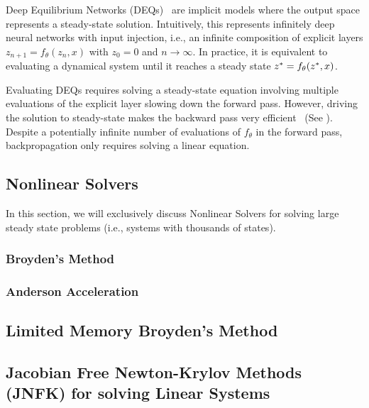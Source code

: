 Deep Equilibrium Networks (DEQs)~\citep{bai_deep_2019} are implicit models where the output space represents a steady-state solution. Intuitively, this represents infinitely deep neural networks with input injection, i.e., an infinite composition of explicit layers $z_{n + 1} = f_\theta(z_n, x)$ with $z_0 = 0$ and $n \rightarrow \infty$. In practice, it is equivalent to evaluating a dynamical system until it reaches a steady state $z^* = f_\theta(z^*, x)$.


Evaluating DEQs requires solving a steady-state equation involving multiple evaluations of the explicit layer slowing down the forward pass. However, driving the solution to steady-state makes the backward pass very efficient~\citep{johnson2012notes} (See ). Despite a potentially infinite number of evaluations of $f_\theta$ in the forward pass, backpropagation only requires solving a linear equation.

\subsection{Nonlinear Solvers}
\label{subsec:nonlinear_solvers_deqs}

In this section, we will exclusively discuss Nonlinear Solvers for solving large steady state problems (i.e., systems with thousands of states).

\subsubsection{Broyden's Method}
\label{subsubsec:broyden_method}

\subsubsection{Anderson Acceleration}
\label{subsubsec:anderson_acceleration}

\subsection{Limited Memory Broyden's Method}
\label{subsec:limited_memory_broyden}

\subsection{Jacobian Free Newton-Krylov Methods (JNFK) for solving Linear Systems}
\label{subsec:newton_krylov_methods}

